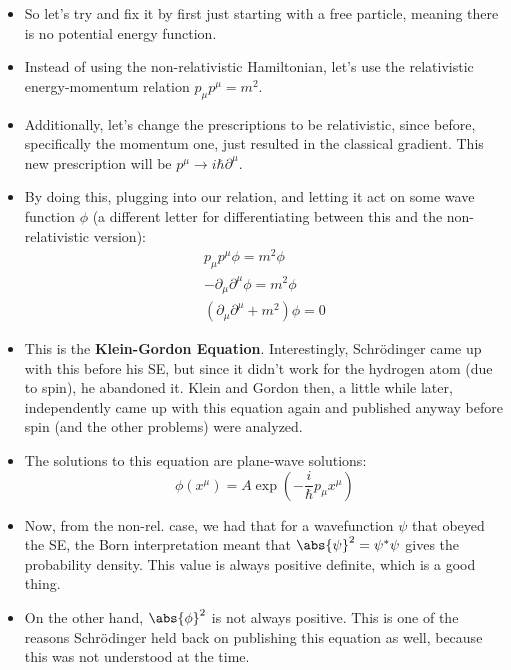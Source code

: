 \begin{itemize}
    \item So let's try and fix it by first just starting with a free particle, meaning there is no potential energy function.
    \item Instead of using the non-relativistic Hamiltonian, let's use the relativistic energy-momentum relation $p_{\mu}p^{\mu} = m^2$.
    \item Additionally, let's change the prescriptions to be relativistic, since before, specifically the momentum one, just resulted in the classical gradient. This new prescription will be $p^{\mu} \rightarrow i\hbar \partial^{\mu}$. 
    \item By doing this, plugging into our relation, and letting it act on some wave function $\phi$ (a different letter for differentiating between this and the non-relativistic version):
        \begin{gather}
            p_{\mu}p^{\mu}\phi = m^2\phi \\
            -\partial_{\mu}\partial^{\mu} \phi = m^2 \phi \\
            \boxed{(\partial_{\mu}\partial^{\mu} + m^2)\phi = 0}
        \end{gather}
    \item This is the \textbf{Klein-Gordon Equation}. Interestingly, Schr\"odinger came up with this before his SE, but since it didn't work for the hydrogen atom (due to spin), he abandoned it. Klein and Gordon then, a little while later, independently came up with this equation again and published anyway before spin (and the other problems) were analyzed.
    \item The solutions to this equation are plane-wave solutions:
        \begin{equation}
            \phi(x^{\mu}) = A\exp\left(-\frac{i}{\hbar} p_{\mu}x^{\mu}\right)\label{KleinGordonSolutions}
        \end{equation}
\end{itemize}



\begin{itemize}
    \item Now, from the non-rel. case, we had that for a wavefunction $\psi$ that obeyed the SE, the Born interpretation meant that $\abs{\psi}^2 = \psi^*\psi$ gives the probability density. This value is always positive definite, which is a good thing.
    \item On the other hand, $\abs{\phi}^2$ is not always positive. This is one of the reasons Schr\"odinger held back on publishing this equation as well, because this was not understood at the time. 
\end{itemize}




